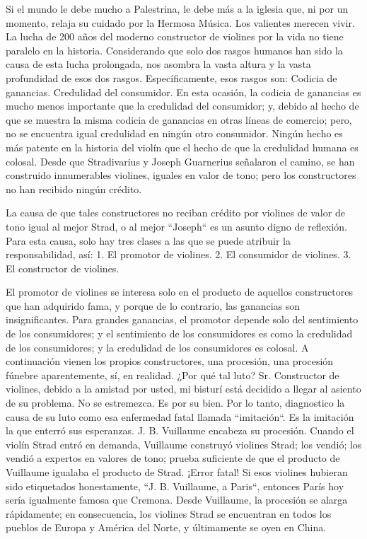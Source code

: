 \documentclass[12pt]{book}
\begin{document}
Si el mundo le debe mucho a Palestrina, le debe más a la iglesia que, ni por un momento, relaja su cuidado por la Hermosa Música. Los valientes merecen vivir. La lucha de 200 años del moderno constructor de violines por la vida no tiene paralelo en la historia. Considerando que solo dos rasgos humanos han sido la causa de esta lucha prolongada, nos asombra la vasta altura y la vasta profundidad de esos dos rasgos. Específicamente, esos rasgos son: Codicia de ganancias. Credulidad del consumidor. En esta ocasión, la codicia de ganancias es mucho menos importante que la credulidad del consumidor; y, debido al hecho de que se muestra la misma codicia de ganancias en otras líneas de comercio; pero, no se encuentra igual credulidad en ningún otro consumidor. Ningún hecho es más patente en la historia del violín que el hecho de que la credulidad humana es colosal. Desde que Stradivarius y Joseph Guarnerius señalaron el camino, se han construido innumerables violines, iguales en valor de tono; pero los constructores no han recibido ningún crédito.

La causa de que tales constructores no reciban crédito por violines de valor de tono igual al mejor Strad, o al mejor ``Joseph`` es un asunto digno de reflexión. Para esta causa, solo hay tres clases a las que se puede atribuir la responsabilidad, así: 1. El promotor de violines. 2. El consumidor de violines. 3. El constructor de violines.

El promotor de violines se interesa solo en el producto de aquellos constructores que han adquirido fama, y porque de lo contrario, las ganancias son insignificantes. Para grandes ganancias, el promotor depende solo del sentimiento de los consumidores; y el sentimiento de los consumidores es como la credulidad de los consumidores; y la credulidad de los consumidores es colosal. A continuación vienen los propios constructores, una procesión, una procesión fúnebre aparentemente, sí, en realidad. ¿Por qué tal luto? Sr. Constructor de violines, debido a la amistad por usted, mi bisturí está decidido a llegar al asiento de su problema. No se estremezca. Es por su bien. Por lo tanto, diagnostico la causa de su luto como esa enfermedad fatal llamada ``imitación``. Es la imitación la que enterró sus esperanzas. J. B. Vuillaume encabeza su procesión. Cuando el violín Strad entró en demanda, Vuillaume construyó violines Strad; los vendió; los vendió a expertos en valores de tono; prueba suficiente de que el producto de Vuillaume igualaba el producto de Strad. ¡Error fatal! Si esos violines hubieran sido etiquetados honestamente, ``J. B. Vuillaume, a Paris``, entonces París hoy sería igualmente famosa que Cremona.
Desde Vuillaume, la procesión se alarga rápidamente; en consecuencia, los violines Strad se encuentran en todos los pueblos de Europa y América del Norte, y últimamente se oyen en China.
\end{document}
